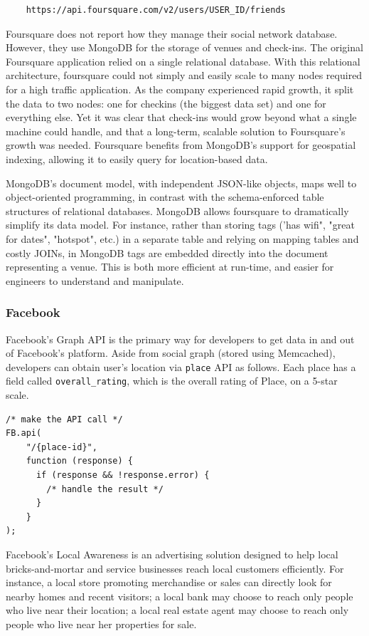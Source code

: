 \begin{verbatim}
	https://api.foursquare.com/v2/users/USER_ID/friends
\end{verbatim}

Foursquare does not report how they manage their social network database. However, they use MongoDB for the storage of venues and check-ins\cite{4qrmongo}. The original Foursquare application relied on a single relational database. With this relational architecture, foursquare could not simply and easily scale to many nodes required for a high traffic application. As the company experienced rapid growth, it split the data to two nodes: one for checkins (the biggest data set) and one for everything else. Yet it was clear that check-ins would grow beyond what a single machine could handle, and that a long-term, scalable solution to Foursquare's growth was needed. Foursquare benefits from MongoDB’s support for geospatial indexing, allowing it to easily query for location-based data. 

MongoDB's document model, with independent JSON-like objects, maps well to object-oriented programming, in contrast with the schema-enforced table structures of relational databases. MongoDB allows foursquare to dramatically simplify its data model. For instance, rather than storing tags ('has wifi", "great for dates", "hotspot", etc.) in a separate table and relying on mapping tables and costly JOINs, in MongoDB tags are embedded directly into the document representing a venue. This is both more efficient at run-time, and easier for engineers to understand and manipulate.

\subsubsection{Facebook}
Facebook's Graph API is the primary way for developers to get data in and out of Facebook's platform. Aside from social graph (stored using Memcached\cite{memcached}), developers can obtain user's location via \texttt{place} API as follows. 
Each place has a field called \texttt{overall\_rating}, which is the overall rating of Place, on a 5-star scale.

\begin{verbatim}
/* make the API call */
FB.api(
    "/{place-id}",
    function (response) {
      if (response && !response.error) {
        /* handle the result */
      }
    }
);
\end{verbatim}


Facebook's Local Awareness is an advertising solution designed to help local bricks-and-mortar and service businesses reach local customers efficiently. For instance, a local store promoting merchandise or sales can directly look for nearby homes and recent visitors; a local bank may choose to reach only people who live near their location; a local real estate agent may choose to reach only people who live near her properties for sale. 


